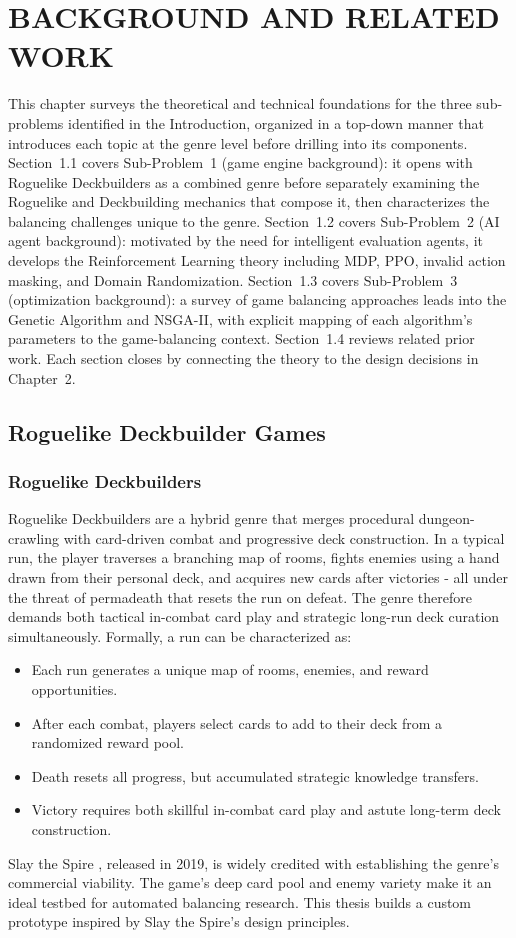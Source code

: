\clearpage
{}
\chapter{BACKGROUND AND RELATED WORK}

This chapter surveys the theoretical and technical foundations for the three sub-problems identified in the Introduction, organized in a top-down manner that introduces each topic at the genre level before drilling into its components. Section~1.1 covers Sub-Problem~1 (game engine background): it opens with Roguelike Deckbuilders as a combined genre before separately examining the Roguelike and Deckbuilding mechanics that compose it, then characterizes the balancing challenges unique to the genre. Section~1.2 covers Sub-Problem~2 (AI agent background): motivated by the need for intelligent evaluation agents, it develops the Reinforcement Learning theory including MDP, PPO, invalid action masking, and Domain Randomization. Section~1.3 covers Sub-Problem~3 (optimization background): a survey of game balancing approaches leads into the Genetic Algorithm and NSGA-II, with explicit mapping of each algorithm's parameters to the game-balancing context. Section~1.4 reviews related prior work. Each section closes by connecting the theory to the design decisions in Chapter~2.

\section{Roguelike Deckbuilder Games}

\subsection{Roguelike Deckbuilders}

Roguelike Deckbuilders are a hybrid genre that merges procedural dungeon-crawling with card-driven combat and progressive deck construction. In a typical run, the player traverses a branching map of rooms, fights enemies using a hand drawn from their personal deck, and acquires new cards after victories - all under the threat of permadeath that resets the run on defeat. The genre therefore demands both tactical in-combat card play and strategic long-run deck curation simultaneously. Formally, a run can be characterized as:
\begin{itemize}
    \item Each run generates a unique map of rooms, enemies, and reward opportunities.
    \item After each combat, players select cards to add to their deck from a randomized reward pool.
    \item Death resets all progress, but accumulated strategic knowledge transfers.
    \item Victory requires both skillful in-combat card play and astute long-term deck construction.
\end{itemize}
Slay the Spire \cite{slaythespire}, released in 2019, is widely credited with establishing the genre's commercial viability. The game's deep card pool and enemy variety make it an ideal testbed for automated balancing research. This thesis builds a custom prototype inspired by Slay the Spire's design principles.

